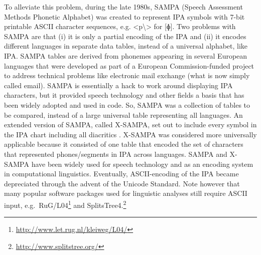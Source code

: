 To alleviate this problem, during the late 1980s, SAMPA (Speech Assessment
Methods Phonetic Alphabet) was created to represent IPA symbols with 7-bit
printable ASCII character sequences, e.g. <p\textbackslash> for [ɸ]. Two
problems with SAMPA are that (i) it is only a partial encoding of the IPA and
(ii) it encodes different languages in separate data tables, instead of a
universal alphabet, like IPA. SAMPA tables are derived from phonemes appearing
in several European languages that were developed as part of a European
Commission-funded project to address technical problems like electronic mail
exchange (what is now simply called email). SAMPA is essentially a hack to work
around displaying IPA characters, but it provided speech technology and other
fields a basis that has been widely adopted and used in code. So, SAMPA was a
collection of tables to be compared, instead of a large universal table
representing all languages. An extended version of SAMPA, called X-SAMPA, set
out to include every symbol in the IPA chart including all diacritics
\citep{WellsND}. X-SAMPA was considered more universally applicable because it
consisted of one table that encoded the set of characters that represented
phones/segments in IPA across languages. SAMPA and X-SAMPA have been widely used
for speech technology and as an encoding system in computational linguistics.
Eventually, ASCII-encoding of the IPA became depreciated through the advent of
the Unicode Standard. Note however that many popular software packages used for
linguistic analyses still require ASCII input,
e.g.~RuG/L04\footnote{\url{http://www.let.rug.nl/kleiweg/L04/}} and
SplitsTree4.\footnote{\url{http://www.splitstree.org/}}

